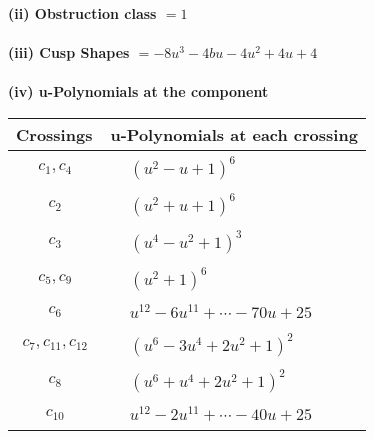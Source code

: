\documentclass[1p]{elsarticle_modified}
\theoremstyle{definition}
\begin{document}
\flushleft \textbf{(ii) Obstruction class $= 1$}\\~\\
\flushleft \textbf{(iii) Cusp Shapes $= -8 u^3-4 b u-4 u^2+4 u+4$}\\~\\
\newpage\renewcommand{\arraystretch}{1}
\flushleft \textbf{(iv) u-Polynomials at the component}\newline \\
\begin{tabular}{m{50pt}|m{274pt}}
Crossings & \hspace{64pt}u-Polynomials at each crossing \\
\hline $$\begin{aligned}c_{1},c_{4}\end{aligned}$$&$\begin{aligned}
&(u^2- u+1)^6
\end{aligned}$\\
\hline $$\begin{aligned}c_{2}\end{aligned}$$&$\begin{aligned}
&(u^2+u+1)^6
\end{aligned}$\\
\hline $$\begin{aligned}c_{3}\end{aligned}$$&$\begin{aligned}
&(u^4- u^2+1)^3
\end{aligned}$\\
\hline $$\begin{aligned}c_{5},c_{9}\end{aligned}$$&$\begin{aligned}
&(u^2+1)^6
\end{aligned}$\\
\hline $$\begin{aligned}c_{6}\end{aligned}$$&$\begin{aligned}
&u^{12}-6 u^{11}+\cdots-70 u+25
\end{aligned}$\\
\hline $$\begin{aligned}c_{7},c_{11},c_{12}\end{aligned}$$&$\begin{aligned}
&(u^6-3 u^4+2 u^2+1)^2
\end{aligned}$\\
\hline $$\begin{aligned}c_{8}\end{aligned}$$&$\begin{aligned}
&(u^6+u^4+2 u^2+1)^2
\end{aligned}$\\
\hline $$\begin{aligned}c_{10}\end{aligned}$$&$\begin{aligned}
&u^{12}-2 u^{11}+\cdots-40 u+25
\end{aligned}$\\
\hline
\end{tabular}\\~\\
\end{document}
